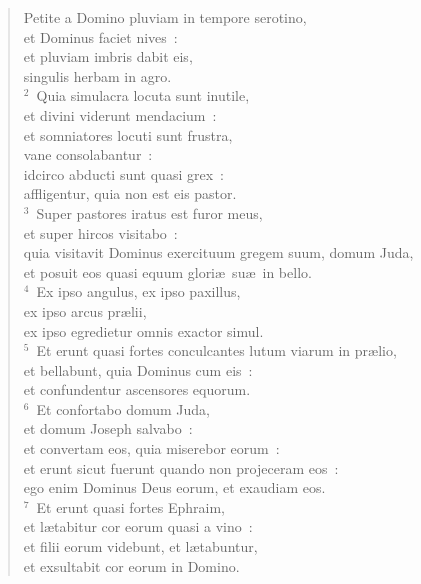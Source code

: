 \begin{flushleft}\begin{verse}\vspace{-19pt}\hspace{6pt}Petite a Domino pluviam in tempore serotino,\\\hspace{6pt} et Dominus faciet nives~:\\ et pluviam imbris dabit eis,\\ singulis herbam in agro.\\
${}^{2}$~Quia simulacra locuta sunt inutile,\\ et divini viderunt mendacium~:\\ et somniatores locuti sunt frustra,\\ vane consolabantur~:\\ idcirco abducti sunt quasi grex~:\\ affligentur, quia non est eis pastor.\\
${}^{3}$~Super pastores iratus est furor meus,\\ et super hircos visitabo~:\\ quia visitavit Dominus exercituum gregem suum, domum Juda,\\ et posuit eos quasi equum glori\ae\ su\ae\ in bello.\\
${}^{4}$~Ex ipso angulus, ex ipso paxillus,\\ ex ipso arcus pr\ae lii,\\ ex ipso egredietur omnis exactor simul.\\
${}^{5}$~Et erunt quasi fortes conculcantes lutum viarum in pr\ae lio,\\ et bellabunt, quia Dominus cum eis~:\\ et confundentur ascensores equorum.\\
${}^{6}$~Et confortabo domum Juda,\\ et domum Joseph salvabo~:\\ et convertam eos, quia miserebor eorum~:\\ et erunt sicut fuerunt quando non projeceram eos~:\\ ego enim Dominus Deus eorum, et exaudiam eos.\\
${}^{7}$~Et erunt quasi fortes Ephraim,\\ et l\ae tabitur cor eorum quasi a vino~:\\ et filii eorum videbunt, et l\ae tabuntur,\\ et exsultabit cor eorum in Domino.\\

\end{verse}
\end{flushleft}
